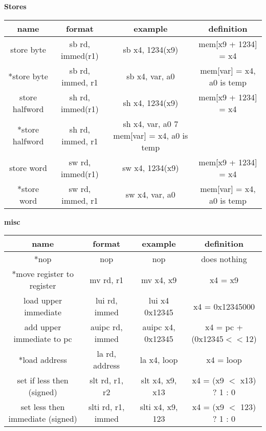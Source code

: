 \documentclass{article}
\begin{document}
\begin{center}
  \textbf{Stores}

  \begin{tabular}{|c|c|c|c|}
    \hline
    name            & format            & example          & definition \\
    \hline
    store byte & sb rd, immed(r1) & sb x4, 1234(x9) & mem[x9 + 1234] = x4 \\
    *store byte & sb rd, immed, r1 & sb x4, var, a0 & mem[var] = x4, a0 is temp\\
    store halfword & sh rd, immed(r1) & sh x4, 1234(x9) & mem[x9 + 1234] = x4 \\
    *store halfword & sh rd, immed, r1 & sh x4, var, a0 7 mem[var] = x4, a0 is temp\\
    store word & sw rd, immed(r1) & sw x4, 1234(x9) & mem[x9 + 1234] = x4 \\
    *store word & sw rd, immed, r1 & sw x4, var, a0 & mem[var] = x4, a0 is temp\\
    \hline
  \end{tabular}

  \textbf{misc}

  \begin{tabular}{|c|c|c|c|}
    \hline
    name                             & format             & example           & definition      \\
    \hline
    *nop                              & nop                & nop               & does nothing    \\
    *move register to register        & mv rd, r1          & mv x4, x9         & x4 = x9         \\
    load upper immediate             & lui rd, immed      & lui x4 0x12345    & x4 = 0x12345000
    \\
    add upper immediate to pc        & auipc rd, immed    & auipc x4, 0x12345 & x4 = pc +
    (0x12345$<<$12)                                                                             \\
    *load address                     & la rd, address     & la x4, loop       & x4 = loop
    \\
    set if less then (signed)        & slt rd, r1, r2     & slt x4, x9, x13   & x4 = (x9 $<$
    x13) ? 1 : 0                                                                                \\
    set less then immediate (signed) & slti rd, r1, immed & slti x4, x9, 123  &
    x4 = (x9 $<$ 123) ? 1 : 0                                                                   \\
    \hline
  \end{tabular}


\end{center}
\end{document}
